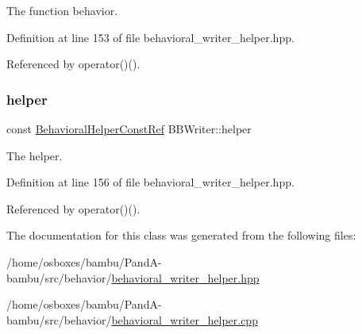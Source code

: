 The function behavior. 



Definition at line 153 of file behavioral\+\_\+writer\+\_\+helper.\+hpp.



Referenced by operator()().

\mbox{\label{classBBWriter_aabfc82d679586f94d2110a3eb9f2d556}} 
\subsubsection{\texorpdfstring{helper}{helper}}
{\footnotesize\ttfamily const \hyperlink{behavioral__helper_8hpp_aae973b54cac87eef3b27442aa3e1e425}{Behavioral\+Helper\+Const\+Ref} B\+B\+Writer\+::helper\hspace{0.3cm}{\ttfamily [private]}}



The helper. 



Definition at line 156 of file behavioral\+\_\+writer\+\_\+helper.\+hpp.



Referenced by operator()().



The documentation for this class was generated from the following files\+:\begin{DoxyCompactItemize}
\item 
/home/osboxes/bambu/\+Pand\+A-\/bambu/src/behavior/\hyperlink{behavioral__writer__helper_8hpp}{behavioral\+\_\+writer\+\_\+helper.\+hpp}\item 
/home/osboxes/bambu/\+Pand\+A-\/bambu/src/behavior/\hyperlink{behavioral__writer__helper_8cpp}{behavioral\+\_\+writer\+\_\+helper.\+cpp}\end{DoxyCompactItemize}
